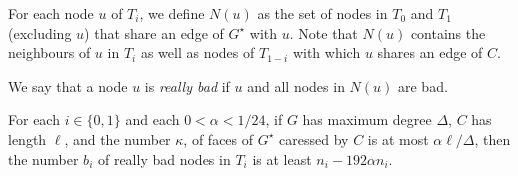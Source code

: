 \documentclass{patmorin}
\newcommand{\dual}[1]{{#1}^\star}
\begin{document}
For each node $u$ of $T_i$, we define $N(u)$ as the set of nodes in $T_0$
and $T_1$ (excluding $u$) that share an edge of $\dual{G}$ with $u$.
Note that $N(u)$ contains the neighbours of $u$ in $T_i$ as well as
nodes of $T_{1-i}$ with which $u$ shares an edge of $C$.


%



We say that a node $u$ is \emph{really bad} if $u$ and all nodes in $N(u)$ are bad.

\begin{lem}
  For each $i\in\{0,1\}$ and each $0<\alpha < 1/24$,
  if $G$ has maximum degree $\Delta$, $C$ has length $\ell$, and the number
  $\kappa$, of faces of $\dual{G}$ caressed by $C$ is at most $\alpha\ell/\Delta$, then the number $b_i$ of really bad nodes in $T_i$ is at least $n_i - 192\alpha n_i$.
\end{lem}
\end{document}
